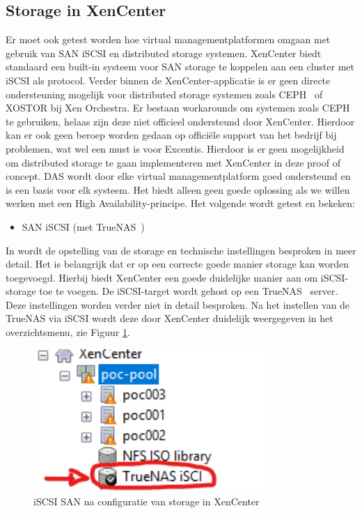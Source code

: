 \subsection{Storage in XenCenter}%
Er moet ook getest worden hoe virtual managementplatformen omgaan met gebruik van SAN iSCSI en distributed storage systemen.
XenCenter biedt standaard een built-in systeem voor SAN storage te koppelen aan een cluster met iSCSI als protocol.
Verder binnen de XenCenter-applicatie is er geen directe ondersteuning mogelijk voor distributed storage systemen zoals CEPH~\autocite{weil2006ceph} of XOSTOR bij Xen Orchestra.
Er bestaan workarounds om systemen zoals CEPH te gebruiken, helaas zijn deze niet officieel ondersteund door XenCenter. Hierdoor kan er ook geen beroep worden gedaan op officiële support van het bedrijf bij problemen, wat wel een must is voor Excentis.
Hierdoor is er geen mogelijkheid om distributed storage te gaan implementeren met XenCenter in deze proof of concept. DAS wordt door elke virtual managementplatform goed ondersteund en is een basis voor elk systeem.
Het biedt alleen geen goede oplossing als we willen werken met een High Availability-principe.
Het volgende wordt getest en bekeken:
\begin{itemize}
\item SAN iSCSI (met TrueNAS~\autocite{truenas})
\end{itemize}
In  wordt de opstelling van de storage en technische instellingen besproken in meer detail.
Het is belangrijk dat er op een correcte goede manier storage kan worden toegevoegd. Hierbij biedt XenCenter een goede duidelijke manier aan om iSCSI-storage toe te voegen.
De iSCSI-target wordt gehost op een TrueNAS~\autocite{truenas} server. Deze instellingen worden verder niet in detail besproken.
Na het instellen van de TrueNAS via iSCSI wordt deze door XenCenter duidelijk weergegeven in het overzichtsmenu, zie Figuur \ref{fig:truenasinlijst-xen}.
\begin{figure}[H]
\centering
\includegraphics[width=0.8\textwidth]{../poc/truenasinlijst-xen.png}
\caption{iSCSI SAN na configuratie van storage in XenCenter}
\label{fig:truenasinlijst-xen}
\end{figure}

